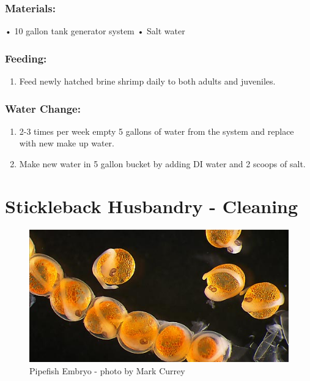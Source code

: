 \documentclass[
]{book}
\providecommand{\tightlist}{%
  \setlength{\itemsep}{0pt}\setlength{\parskip}{0pt}}
\begin{document}
\hypertarget{materials-3}{%
\subsection{Materials:}\label{materials-3}}

• 10 gallon tank generator system
• Salt water

\hypertarget{feeding-1}{%
\subsection{Feeding:}\label{feeding-1}}

\begin{enumerate}
\def\labelenumi{\arabic{enumi}.}
\tightlist
\item
  Feed newly hatched brine shrimp daily to both adults and juveniles.
\end{enumerate}

\hypertarget{water-change}{%
\subsection{Water Change:}\label{water-change}}

\begin{enumerate}
\def\labelenumi{\arabic{enumi}.}
\tightlist
\item
  2-3 times per week empty 5 gallons of water from the system and replace with new make up water.
\item
  Make new water in 5 gallon bucket by adding DI water and 2 scoops of salt.
\end{enumerate}

\hypertarget{stickleback-husbandry---cleaning}{%
\chapter{Stickleback Husbandry - Cleaning}\label{stickleback-husbandry---cleaning}}

\begin{figure}
\centering
\includegraphics{images/pipefish_embryos.jpg}
\caption{Pipefish Embryo - photo by Mark Currey}
\end{figure}
\end{document}
